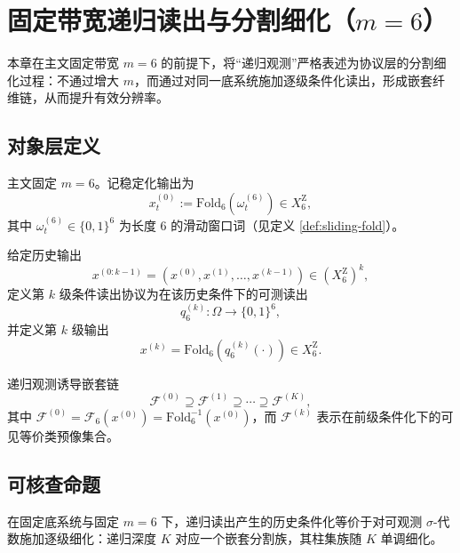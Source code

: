 \section{固定带宽递归读出与分割细化（\texorpdfstring{$m=6$}{m=6}）}

本章在主文固定带宽 $m=6$ 的前提下，将“递归观测”严格表述为协议层的分割细化过程：不通过增大 $m$，而通过对同一底系统施加逐级条件化读出，形成嵌套纤维链，从而提升有效分辨率。

\subsection{对象层定义}

\begin{definition}[第一级输出]\label{def:rec-level0}
主文固定 $m=6$。记稳定化输出为
$$
x^{(0)}_t:=\mathrm{Fold}_6(\omega_t^{(6)})\in X_6^{\mathrm Z},
$$
其中 $\omega_t^{(6)}\in\{0,1\}^6$ 为长度 $6$ 的滑动窗口词（见定义 \ref{def:sliding-fold}）。
\end{definition}

\begin{definition}[第 $k$ 级条件读出与输出]\label{def:rec-levelk}
给定历史输出
$$
x^{(0:k-1)}=(x^{(0)},x^{(1)},\dots,x^{(k-1)})\in (X_6^{\mathrm Z})^{k},
$$
定义第 $k$ 级条件读出协议为在该历史条件下的可测读出
$$
q_6^{(k)}:\Omega\to \{0,1\}^6,
$$
并定义第 $k$ 级输出
$$
x^{(k)}=\mathrm{Fold}_6\!\left(q_6^{(k)}(\cdot)\right)\in X_6^{\mathrm Z}.
$$
\end{definition}

\begin{definition}[嵌套纤维链]\label{def:rec-nested-fibers}
递归观测诱导嵌套链
$$
\mathcal{F}^{(0)}\supseteq \mathcal{F}^{(1)}\supseteq \cdots \supseteq \mathcal{F}^{(K)},
$$
其中 $\mathcal{F}^{(0)}=\mathcal{F}_6(x^{(0)})=\mathrm{Fold}_6^{-1}(x^{(0)})$，而 $\mathcal{F}^{(k)}$ 表示在前级条件化下的可见等价类预像集合。
\end{definition}

\subsection{可核查命题}

\begin{proposition}[R1：递归读出等价于分割的逐级细化]\label{prop:rec-R1}
在固定底系统与固定 $m=6$ 下，递归读出产生的历史条件化等价于对可观测 $\sigma$-代数施加逐级细化：递归深度 $K$ 对应一个嵌套分割族，其柱集族随 $K$ 单调细化。
\end{proposition}

